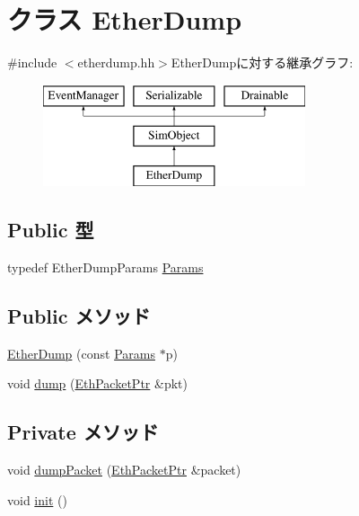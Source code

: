 \hypertarget{classEtherDump}{
\section{クラス EtherDump}
\label{classEtherDump}
}


{\ttfamily \#include $<$etherdump.hh$>$}EtherDumpに対する継承グラフ:\begin{figure}[H]
\begin{center}
\leavevmode
\includegraphics[height=3cm]{classEtherDump}
\end{center}
\end{figure}
\subsection*{Public 型}
\begin{DoxyCompactItemize}
\item 
typedef EtherDumpParams \hyperlink{classEtherDump_a1c09075a361c5596c4f4523d9b570438}{Params}
\end{DoxyCompactItemize}
\subsection*{Public メソッド}
\begin{DoxyCompactItemize}
\item 
\hyperlink{classEtherDump_aa69b0ba907f0f8cfcd7e311bd7da83ac}{EtherDump} (const \hyperlink{classEtherDump_a1c09075a361c5596c4f4523d9b570438}{Params} $\ast$p)
\item 
void \hyperlink{classEtherDump_a4fd2deacb5bb2820bdba7d369a17e72f}{dump} (\hyperlink{classRefCountingPtr}{EthPacketPtr} \&pkt)
\end{DoxyCompactItemize}
\subsection*{Private メソッド}
\begin{DoxyCompactItemize}
\item 
void \hyperlink{classEtherDump_a38068da876076f5fe0bdfd8f9b2a5290}{dumpPacket} (\hyperlink{classRefCountingPtr}{EthPacketPtr} \&packet)
\item 
void \hyperlink{classEtherDump_a02fd73d861ef2e4aabb38c0c9ff82947}{init} ()
\end{DoxyCompactItemize}
